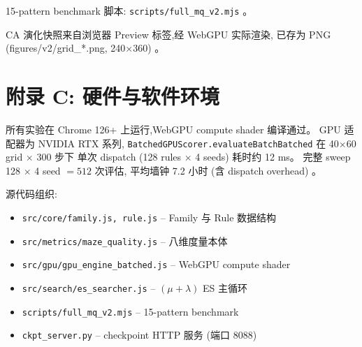 \documentclass[11pt,a4paper]{article}
\begin{document}
15-pattern benchmark 脚本: \texttt{scripts/full\_mq\_v2.mjs} 。

CA 演化快照来自浏览器 Preview 标签,经 WebGPU 实际渲染,
已存为 PNG (figures/v2/grid\_*.png, 240$\times$360) 。

\section{附录 C: 硬件与软件环境}
所有实验在 Chrome 126+ 上运行,WebGPU compute shader 编译通过。
GPU 适配器为 NVIDIA RTX 系列,
\texttt{BatchedGPUScorer.evaluateBatchBatched} 在 40$\times$60 grid $\times$ 300 步下
单次 dispatch (128 rules $\times$ 4 seeds) 耗时约 12 ms。
完整 sweep 128 $\times$ 4 seed $= 512$ 次评估,
平均墙钟 7.2 小时 (含 dispatch overhead) 。

源代码组织:
\begin{itemize}[leftmargin=*,itemsep=0pt,topsep=0pt]
\item \texttt{src/core/family.js, rule.js} -- Family 与 Rule 数据结构
\item \texttt{src/metrics/maze\_quality.js} -- 八维度量本体
\item \texttt{src/gpu/gpu\_engine\_batched.js} -- WebGPU compute shader
\item \texttt{src/search/es\_searcher.js} -- $(\mu+\lambda)$ ES 主循环
\item \texttt{scripts/full\_mq\_v2.mjs} -- 15-pattern benchmark
\item \texttt{ckpt\_server.py} -- checkpoint HTTP 服务 (端口 8088)
\end{itemize}
\end{document}
